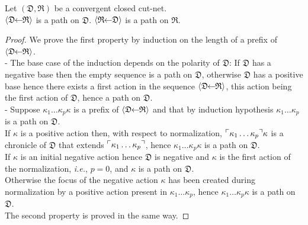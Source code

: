 \documentclass{LMCS}
\def\ie{{\em i.e.}}
\newcommand{\design}[1]{{\mathfrak{#1}}}
\begin{document}
\begin{prop}\label{prop:NormPath}
 Let $(\design{D},\design{R})$ be a convergent closed cut-net.\\
$\normalisationSeq{\design{D}}{\design{R}}$ is a path on $\design{D}$.
$\normalisationSeq{\design{R}}{\design{D}}$ is a path on $\design{R}$.
\end{prop}
\begin{proof}
We prove the first property by induction on the length of a prefix of $\normalisationSeq{\design{D}}{\design{R}}$.\\
- The base case of the induction depends on the polarity of $\design{D}$: If $\design{D}$ has a negative base then the empty sequence is a path on $\design{D}$, otherwise $\design{D}$ has a positive base hence there exists a first action in the sequence $\normalisationSeq{\design{D}}{\design{R}}$, this action being the first action of $\design{D}$, hence a path on $\design{D}$.\\
- Suppose $\kappa_1\dots\kappa_p\kappa$ is a prefix of $\normalisationSeq{\design{D}}{\design{R}}$ and that by induction hypothesis $\kappa_1\dots\kappa_p$ is a path on $\design{D}$.\\
If $\kappa$ is a positive action then, with respect to normalization, $\view{\kappa_1\dots\kappa_p}\kappa$ is a chronicle of $\design{D}$ that extends $\view{\kappa_1\dots\kappa_p}$, hence $\kappa_1\dots\kappa_p\kappa$ is a path on $\design{D}$.\\
If $\kappa$ is an initial negative action hence $\design{D}$ is negative and $\kappa$ is the first action of the normalization, \ie, $p=0$, and $\kappa$ is a path on $\design{D}$.\\
Otherwise the focus of the negative action $\kappa$ has been created during normalization by a positive action present in $\kappa_1\dots\kappa_p$, hence $\kappa_1\dots\kappa_p\kappa$ is a path on $\design{D}$.\\
The second property is proved in the same way.
\end{proof}
\end{document}

